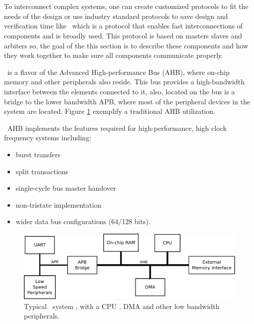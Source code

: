 \section{\amba}
\label{sec:amba2}
To interconnect complex systems, one can create customized protocols to fit the needs of the design or use industry standard protocols to save design and verification time like \amba~which is a protocol that enables fast interconnections of components and is broadly used. This protocol is based on masters slaves and arbiters so, the goal of the this section is to describe these components and how they work together to make sure all components communicate properly.

\amba~is a flavor of the Advanced High-performance Bus (AHB), where on-chip memory and other peripherals also reside. This bus provides a high-bandwidth interface between the elements connected to it, also, located on the bus is a bridge to the lower bandwidth APB, where most of the peripheral devices in the system are located. Figure \ref{fig:general} exemplify a traditional AHB utilization.

\amba~AHB implements the features required for high-performance, high clock
frequency systems including:
\begin{itemize}
 \item {burst transfers}
\item {split transactions}
\item {single-cycle bus master handover}
\item {non-tristate implementation}
\item {wider data bus configurations (64/128 bits).}
\end{itemize}

 \begin{figure}[!ht]
    \centering
    \includegraphics[width=1\textwidth]{figures/pdf/typical_amba_new.pdf}
    \caption{Typical \amba~system , with a CPU , DMA and other low bandwidth peripherals. }
    \label{fig:general}
\end{figure}


